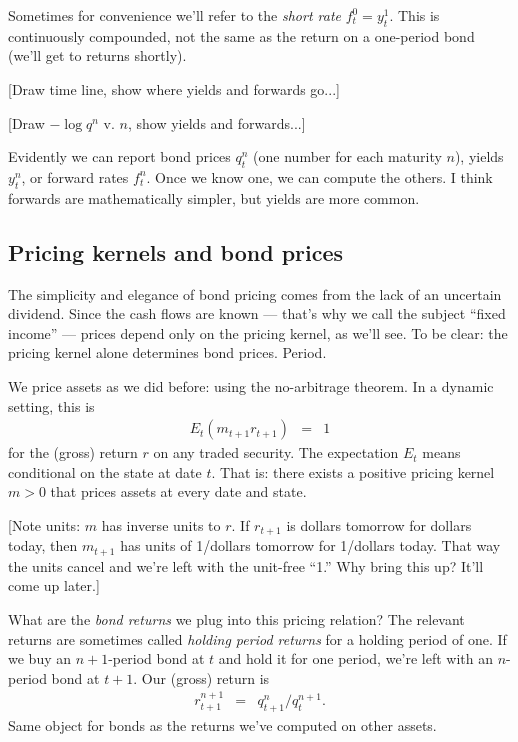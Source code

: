 \documentclass[11pt]{article}
\begin{document}
Sometimes for convenience we'll refer to the {\it short rate\/}
$f^0_t = y^1_t$.
This is continuously compounded, not the same as the return on
a one-period bond (we'll get to returns shortly).

[Draw time line, show where yields and forwards go...]

[Draw $-\log q^n$ v. $n$, show yields and forwards...]

Evidently we can report bond prices $q^n_t$ (one number for each maturity $n$),
yields $y^n_t$, or forward rates $f^n_t$.
Once we know one, we can compute the others.
I think forwards are mathematically simpler,
but yields are more common.


\subsection*{Pricing kernels and bond prices}

The simplicity and elegance of bond pricing comes
from the lack of an uncertain dividend.
Since the cash flows are known ---
that's why we call the subject ``fixed income'' ---
prices depend only on the pricing kernel, as we'll see.
To be clear:  the pricing kernel alone determines
bond prices.  Period.


We price assets as we did before:  using the no-arbitrage theorem.
In a dynamic setting, this is
\begin{eqnarray}
    E_t \left( m_{t+1} r_{t+1} \right) &=& 1
    \label{eq:E(mr)=1}
\end{eqnarray}
for the (gross) return $r$ on any traded security.
The expectation $E_t$ means conditional on the state at date $t$.
That is:  there exists a positive pricing kernel $m>0$
that prices assets at every date and state.

[Note units:  $m$ has inverse units to $r$.
If $r_{t+1}$ is dollars tomorrow for dollars today,
then $m_{t+1}$ has units of 1/dollars tomorrow
for 1/dollars today.
That way the units cancel and we're left with the unit-free ``1.''
Why bring this up?  It'll come up later.]

What are the {\it bond returns\/} we plug into this pricing relation?
The relevant returns are sometimes called {\it holding period returns\/}
for a holding period of one.
If we buy an $n+1$-period bond at $t$ and hold it for one period,
we're left with an $n$-period bond at $t+1$.
Our (gross) return is
\begin{eqnarray}
        r^{n+1}_{t+1} &=&  q^n_{t+1}/q^{n+1}_t .
        \label{eq:bond-returns}
\end{eqnarray}
Same object for bonds as the returns we've computed on
other assets.
\end{document}
